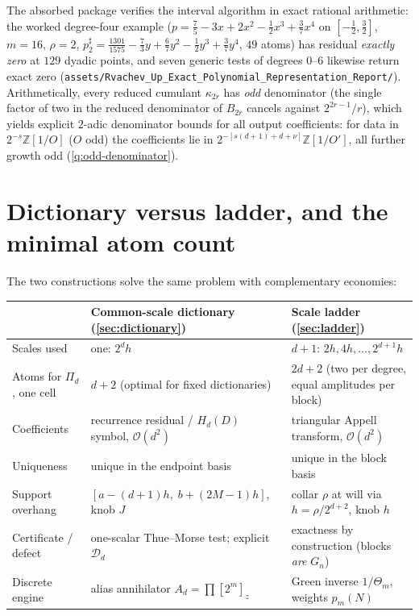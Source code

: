 \documentclass[11pt,oneside]{article}
\numberwithin{equation}{section}
\theoremstyle{definition}
\theoremstyle{remark}
\newcommand{\Z}{\mathbb Z}
\newcommand{\bigO}{\mathcal O}
\newcommand{\ThetaTM}{\Theta}
\newcommand{\PiD}{\Pi_d}
\begin{document}
The absorbed package verifies the interval algorithm in exact
rational arithmetic: the worked degree-four example
($p=\tfrac75-3x+2x^{2}-\tfrac12x^{3}+\tfrac37x^{4}$ on
$[-\tfrac12,\tfrac32]$, $m=16$, $\rho=2$,
$p^{\sharp}_2=\tfrac{1301}{1575}-\tfrac73y+\tfrac67y^{2}
-\tfrac12y^{3}+\tfrac37y^{4}$, $49$ atoms) has residual
\emph{exactly zero} at $129$ dyadic points, and seven generic tests
of degrees $0$--$6$ likewise return exact zero
(\nolinkurl{assets/Rvachev_Up_Exact_Polynomial_Representation_Report/}).
Arithmetically, every reduced cumulant $\kappa_{2r}$ has \emph{odd}
denominator (the single factor of two in the reduced denominator of
$B_{2r}$ cancels against $2^{2r-1}/r$), which yields explicit
$2$-adic denominator bounds for all output coefficients: for data in
$2^{-s}\Z[1/O]$ ($O$ odd) the coefficients lie in
$2^{-[s(d+1)+d+\nu]}\Z[1/O']$, all further growth odd
(\cref{q:odd-denominator}).

\section{Dictionary versus ladder, and the minimal atom count}
\label{sec:comparison}

The two constructions solve the same problem with complementary
economies:

\begin{center}
\small
\begin{tabularx}{\textwidth}{@{}p{}XX@{}}
\toprule
 & Common-scale dictionary (\cref{sec:dictionary})
 & Scale ladder (\cref{sec:ladder})\\
\midrule
Scales used & one: $2^{d}h$ & $d+1$: $2h,4h,\dots,2^{d+1}h$\\
Atoms for $\PiD$, one cell & $d+2$ (optimal for fixed dictionaries)
 & $2d+2$ (two per degree, equal amplitudes per block)\\
Coefficients & recurrence residual / $H_d(D)$ symbol,
 $\bigO(d^{2})$ & triangular Appell transform, $\bigO(d^{2})$\\
Uniqueness & unique in the endpoint basis
 & unique in the block basis\\
Support overhang & $[a-(d+1)h,\;b+(2M-1)h]$, knob $J$
 & collar $\rho$ at will via $h=\rho/2^{d+2}$, knob $h$\\
Certificate / defect & one-scalar Thue--Morse test; explicit
 $\mathcal D_d$ & exactness by construction (blocks \emph{are}
 $G_n$)\\
Discrete engine & alias annihilator $A_d=\prod[2^{m}]_z$
 & Green inverse $1/\ThetaTM_{m}$, weights $p_m(N)$\\
\bottomrule
\end{tabularx}
\end{center}
\end{document}
